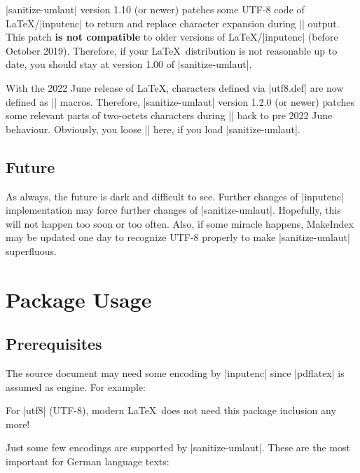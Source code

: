 \documentclass[a4paper,11pt]{ltxdoc}
\begin{document}
|sanitize-umlaut| version 1.10 (or newer) patches some UTF-8 code of
\LaTeX/|inputenc| to return and replace character expansion during |\index| output.
This patch \textbf{is not compatible} to older versions of \LaTeX/|inputenc| (before October 2019).
Therefore, if your \LaTeX\ distribution is not reasonable up to date, you
should stay at version 1.00 of |sanitize-umlaut|.

With the 2022 June release of \LaTeX, characters defined via |utf8.def| are now
defined as |\protected| macros. Therefore, |sanitize-umlaut| version 1.2.0 (or newer)
patches some relevant parts of two-octets characters during |\index| back to
pre 2022 June behaviour. Obviously, you loose |\protected| here, if you
load |sanitize-umlaut|.

\subsection{Future}
As always, the future is dark and difficult to see. Further changes of
|inputenc| implementation may force further changes of |sanitize-umlaut|.
Hopefully, this will not happen too soon or too often.
Also, if some miracle happens, MakeIndex may be updated one day to
recognize UTF-8 properly to make |sanitize-umlaut| superfluous.


\clearpage
\section{Package Usage}%

\subsection{Prerequisites}
The source document may need some encoding by |inputenc| since |pdflatex|
is assumed as engine. For example:

\begin{dispListing}
\usepackage[latin1]{inputenc}
\end{dispListing}

For |utf8| (UTF-8), modern \LaTeX\ does not need this package inclusion any more!

Just some few encodings are supported by |sanitize-umlaut|.
These are the most important for German language texts:

\end{document}
